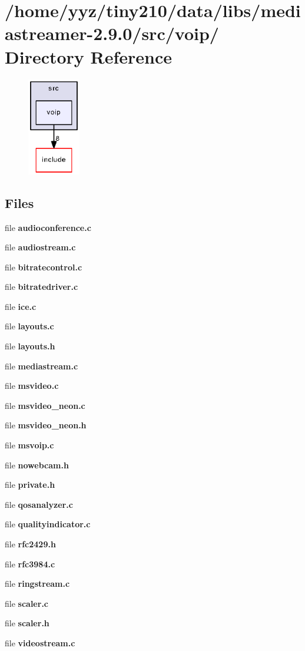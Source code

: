 \section{/home/yyz/tiny210/data/libs/mediastreamer-\/2.9.0/src/voip/ Directory Reference}
\label{dir_2e1ad67a9776c9233b410eeb3273c114}


\nopagebreak
\begin{figure}[H]
\begin{center}
\leavevmode
\includegraphics[width=65pt]{dir_2e1ad67a9776c9233b410eeb3273c114_dep}
\end{center}
\end{figure}
\subsection*{Files}
\begin{DoxyCompactItemize}
\item 
file {\bfseries audioconference.c}
\item 
file {\bfseries audiostream.c}
\item 
file {\bfseries bitratecontrol.c}
\item 
file {\bfseries bitratedriver.c}
\item 
file {\bfseries ice.c}
\item 
file {\bfseries layouts.c}
\item 
file {\bfseries layouts.h}
\item 
file {\bfseries mediastream.c}
\item 
file {\bfseries msvideo.c}
\item 
file {\bfseries msvideo\_\-neon.c}
\item 
file {\bfseries msvideo\_\-neon.h}
\item 
file {\bfseries msvoip.c}
\item 
file {\bfseries nowebcam.h}
\item 
file {\bfseries private.h}
\item 
file {\bfseries qosanalyzer.c}
\item 
file {\bfseries qualityindicator.c}
\item 
file {\bfseries rfc2429.h}
\item 
file {\bfseries rfc3984.c}
\item 
file {\bfseries ringstream.c}
\item 
file {\bfseries scaler.c}
\item 
file {\bfseries scaler.h}
\item 
file {\bfseries videostream.c}
\end{DoxyCompactItemize}

